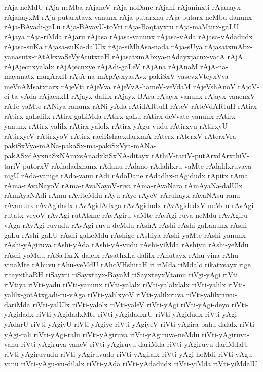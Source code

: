 {rAja-neMdU
rAja-neMba
rAjaneV
rAja-noDane
rAjanf
rAjaninxti
rAjanayx
rAjanayxM
rAja-putarxtavx-vanunx
rAja-putarxnu
rAja-putarx-neMbu-danunx
rAja-BAvadi-gaLu
rAja-BAvavU-toVri
rAja-Baqtayxru
rAja-maMtirx-gaLU
rAjaya
rAja-riMda
rAjaru
rAjasa
rAjasa-vanunx
rAjasa-vAda
rAjasa-vAdadudx
rAjasa-suKa
rAjasa-suKa-dalUlx
rAja-siMhAsa-nada
rAja-sUya
rAjasatxmAbx-yanasutx-rAtAkxvaSeVyAtutxraH
rAjasatxmAbxya-nAdayxjacnx-vacA
rAjA
rAjAjecnxyalalx
rAjAjecnxye
rAjAdi-gaLeV
rAjAna
rAjAnaM
rAjA-na-mayanatx-mugArxH
rAjA-na-mApAyxyasAvx-pakiSxV-yasevxVteyxVva-meVnAMsatxtarx
rAjeVti
rAjeVva
rAjeVvA-hameV-veVdaM
rAjeVshAnoV
rAjoV-ci-ta-vAda
rAjacnxH
rAjayx-dalilx
rAjayx-BAra
rAjayx-vanunx
rAjayx-vanenxV
rATe-yaMte
rANiya-ranunx
rANi-yAda
rAtidARtuH
rAteV
rAteVdARtuH
rAtirx
rAtirx-gaLalilx
rAtirx-gaLiMda
rAtirx-gaLu
rAtirx-deVvate-yanunx
rAtirx-yanunx
rAtirx-yalilx
rAtirx-yalolx
rAtirx-yAgu-vudu
rAtirxyu
rAtirxyU
rAtirxyeV
rAtirxyoV
rAtirx-raciRshacxdarxmA
rAterx
rAterxV
rAterxVra-pakiSxVya-mANa-pakaSx-ma-pakiSxVya-mANa-pakASxdAyxnaSxNAmxsAnadxkiSxNA-ditayx
rAthiV-tariV-putArxdArxthiV-tariV-putorxV
rAdadadxnunx
rAdanu
rAdano
rAdalilxru-vaMte
rAdalilxruvava-nigU
rAda-vanige
rAda-vanu
rAdi
rAdoDane
rAdadhx-nAgidudx
rApitx
rAma
rAma-rAvaNayoV
rAma-rAvaNayoV-riva
rAma-rAvaNara
rAmAyaNa-dalUlx
rAmAyaNAdi
rAmu
rAyiteMdu
rAyu
rAye
rAyeV
rAruhayx
rAvaNAsu-ranu
rAvanunx
rAvAgidadx
rAvAgidAdxga
rAvAgidudx
rAvAgidedxV-neMdu
rAvAgi-rutatx-veyoV
rAvAgi-rutAtxne
rAvAgiru-vaMte
rAvAgi-ruva-neMdu
rAvAgiru-vAga
rAvAgi-ruvudu
rAvAgi-ruvu-deMdu
rAshA
rAshi
rAshi-gaLanunx
rAshi-gaLu
rAshi-gaLU
rAshi-gaLeMdu
rAshige
rAshiya
rAshi-yaMte
rAshi-yanunx
rAshi-yAgiruva
rAshi-yAda
rAshi-yA-vudu
rAshi-yiMda
rAshiyu
rAshi-yeMdu
rAshi-yoMdu
rASaTxrX-dalelx
rAsathxLa-dalilx
rAhutayx
rAhu-vina
rAhu-vinaMte
rAhuvu
rAhu-veMdU
rAhoVHshiraH
ri
riMda
riMdalo
rikatxsayx
rige
ritayxthaRH
riSayxti
riSayxtayx-BayaM
riSayxteyxVtamu
riVgi-yAgi
riVti
riVtiya
riVti-yadu
riVti-yanunx
riVti-yalalx
riVti-yalalxlalx
riVti-yalilx
riVti-yalilx-gotAtxgadi-ru-vAga
riVti-yalilxyoV
riVti-yalilxruva
riVti-yalilxruvu-dariMda
riVti-yalUlx
riVti-yalolx
riVti-yaleV
riVti-yAgi
riVti-yAgi-deyo
riVti-yAgidadx
riVti-yAgidadxMte
riVti-yAgidadxrU
riVti-yAgidudx
riVti-yAgi-yAdarU
riVti-yAgiyU
riVti-yAgiye
riVti-yAgiyeV
riVti-yAgira-bahu-dalalx
riVti-yAgi-rali
riVti-yAgi-ralu
riVti-yAgiruva
riVti-yAgiruva-neMdu
riVti-yAgiruva-vanu
riVti-yAgiruva-vaneV
riVti-yAgiruvu-dariMda
riVti-yAgiruvu-dariMdalU
riVti-yAgiruvudu
riVti-yAgiruvudo
riVti-yAgilalx
riVti-yAgi-hoMdi
riVti-yAgu-vanu
riVti-yAgu-vu-dilalx
riVti-yAda
riVti-yAdadudx
riVti-yiMda
riVti-yiMdalU
}

